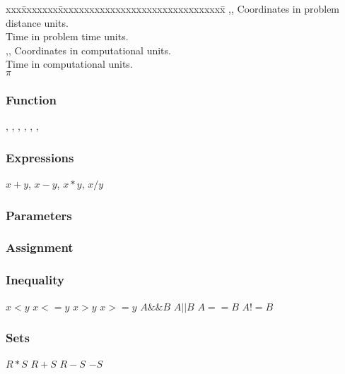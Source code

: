 \begin{tabbing}
xxx\=xxxxxxx\=xxxxxxxxxxxxxxxxxxxxxxxxxxxxxxxx\=\kill
\> ,, \> Coordinates in problem distance units. \\
\>  \> Time in problem time units. \\
\> ,, \> Coordinates in computational units. \\
\>  \> Time in computational units. \\
\>  \> $\pi$ \\
\end{tabbing}


\subsubsection{Function} 

,
,
,
,
,
,


\subsubsection{Expressions} 

$x + y$,
$x - y$,
$x * y$,
$x / y$

\subsubsection{Parameters} 
\subsubsection{Assignment} 
\subsubsection{Inequality} 

$x < y$
$x <= y$
$x > y$
$x >= y$
$A \&\& B$
$A || B$
$A == B$
$A != B$

\subsubsection{Sets}

$R * S$
$R + S$
$R - S$
$-S$



